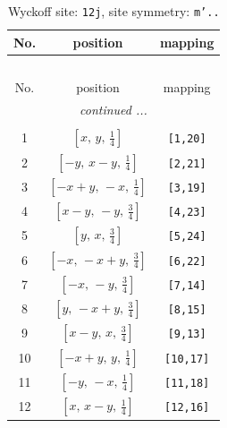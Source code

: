 \documentclass[fleqn,8pt]{jsarticle}
\begin{document}
\begin{longtable}{ccc}
\caption{Wyckoff site: {\tt 12j}, site symmetry: {\tt m'..}}
 \\
 \hline \hline
No. & position & mapping \\ \hline \endfirsthead

\multicolumn{2}{l}{\tablename\ \thetable{}} \\
 \hline \hline
No. & position & mapping \\ \hline \endhead

 \hline \hline
\multicolumn{2}{r}{\footnotesize\it continued ...} \\ \endfoot

 \hline \hline
\multicolumn{2}{r}{} \\ \endlastfoot

1 & $\left[ x,\, y,\, \frac{1}{4} \right]$ & {\tt [1,20]} \\ \hline
2 & $\left[ - y,\, x - y,\, \frac{1}{4} \right]$ & {\tt [2,21]} \\ \hline
3 & $\left[ - x + y,\, - x,\, \frac{1}{4} \right]$ & {\tt [3,19]} \\ \hline
4 & $\left[ x - y,\, - y,\, \frac{3}{4} \right]$ & {\tt [4,23]} \\ \hline
5 & $\left[ y,\, x,\, \frac{3}{4} \right]$ & {\tt [5,24]} \\ \hline
6 & $\left[ - x,\, - x + y,\, \frac{3}{4} \right]$ & {\tt [6,22]} \\ \hline
7 & $\left[ - x,\, - y,\, \frac{3}{4} \right]$ & {\tt [7,14]} \\ \hline
8 & $\left[ y,\, - x + y,\, \frac{3}{4} \right]$ & {\tt [8,15]} \\ \hline
9 & $\left[ x - y,\, x,\, \frac{3}{4} \right]$ & {\tt [9,13]} \\ \hline
10 & $\left[ - x + y,\, y,\, \frac{1}{4} \right]$ & {\tt [10,17]} \\ \hline
11 & $\left[ - y,\, - x,\, \frac{1}{4} \right]$ & {\tt [11,18]} \\ \hline
12 & $\left[ x,\, x - y,\, \frac{1}{4} \right]$ & {\tt [12,16]} \\
\end{longtable}
\renewcommand{\arraystretch}{1.2}
\end{document}
